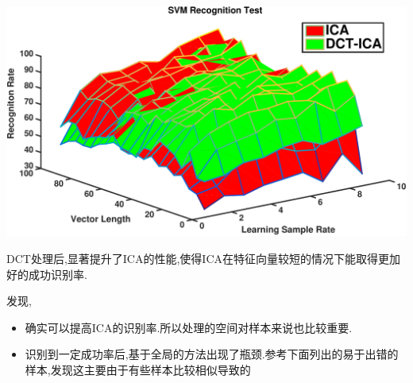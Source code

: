 	\begin{center}
	\begin{minipage}[t]{\linewidth}
	\center
	{
	\includegraphics[width=\textwidth]{Img/svm_ica_dct} 
	}
	\end{minipage}
	\medskip
	\end{center}
	DCT处理后,显著提升了ICA的性能,使得ICA在特征向量较短的情况下能取得更加好的成功识别率.
	
	发现,
	\begin{itemize}
		\item 确实可以提高ICA的识别率.所以处理的空间对样本来说也比较重要.
		\item 识别到一定成功率后,基于全局的方法出现了瓶颈.参考下面列出的易于出错的样本,发现这主要由于有些样本比较相似导致的
	\end{itemize}
